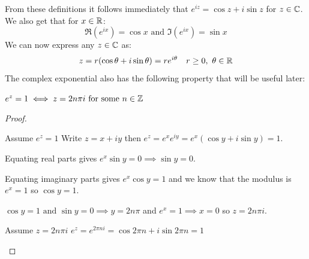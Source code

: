 \documentclass[../main.tex]{subfiles}
\begin{document}
From these definitions it follows immediately that $e^{iz} = \cos z + i\sin z$ for $z \in \mathbb{C}$.
We also get that for $x \in \mathbb{R}$:
\[
  \Re(e^{ix}) = \cos x \text{ and } \Im(e^{ix}) = \sin x
\]
We can now express any $z \in \mathbb{C}$ as:
\[
  z = r(\cos \theta + i\sin\theta) = re^{i\theta}\quad r \geq 0,\ \theta \in \mathbb{R}
\]
The complex exponential also has the following property that will be useful later:
\begin{lemma}
  $e^{z} = 1 \iff z = 2n \pi i \text{ for some } n \in \mathbb{Z}$
  \label{exp1}
\end{lemma}
\begin{proof}
  \begin{proofdirection}{Assume $e^{z} = 1$}
    Write $z = x + iy$ then $e^{z} = e^{x} e^{iy} = e^{x} (\cos y + i \sin y) = 1$.

    Equating real parts gives $e^{x} \sin y = 0 \implies \sin y = 0$.

    Equating imaginary parts gives $e^{x} \cos y = 1$ and we know that the modulus is $e^{x} = 1$ so $\cos y = 1$.

    $\cos y = 1 \text{ and } \sin y = 0 \implies y = 2n\pi$ and $e^{x} = 1 \implies x = 0$ so $z = 2n\pi i$.
  \end{proofdirection}
  \begin{proofdirection}{Assume $z = 2n \pi i$}
    $e^{z} = e^{2 \pi n i} = \cos 2 \pi n + i \sin 2 \pi n = 1$
  \end{proofdirection}
\end{proof}
\end{document}
